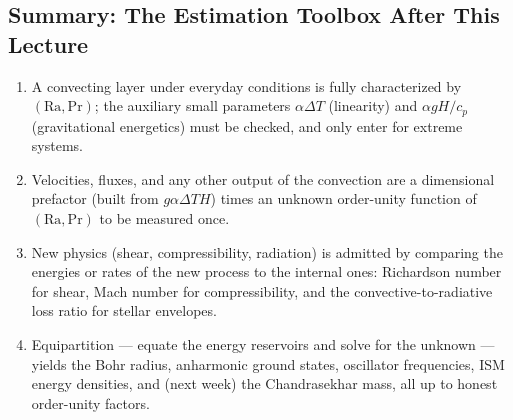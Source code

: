 
\subsection{Summary: The Estimation Toolbox After This Lecture}
\label{sec:lec09:summary}

\begin{enumerate}
    \item A convecting layer under everyday conditions is fully characterized
    by $(\mathrm{Ra},\mathrm{Pr})$; the auxiliary small parameters
    $\alpha\Delta T$ (linearity) and $\alpha gH/c_p$ (gravitational
    energetics) must be checked, and only enter for extreme systems.
    \item Velocities, fluxes, and any other output of the convection are a
    dimensional prefactor (built from $g\alpha\Delta T H$) times an unknown
    order-unity function of $(\mathrm{Ra},\mathrm{Pr})$ to be measured once.
    \item New physics (shear, compressibility, radiation) is admitted by
    comparing the energies or rates of the new process to the internal ones:
    Richardson number for shear, Mach number for compressibility, and the
    convective-to-radiative loss ratio for stellar envelopes.
    \item Equipartition --- equate the energy reservoirs and solve for the
    unknown --- yields the Bohr radius, anharmonic ground states, oscillator
    frequencies, ISM energy densities, and (next week) the Chandrasekhar
    mass, all up to honest order-unity factors.
\end{enumerate}
